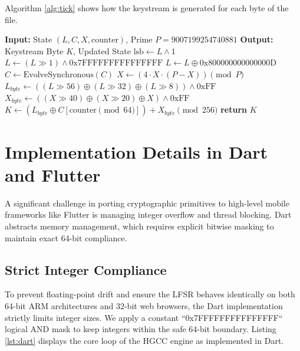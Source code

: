 \documentclass[runningheads]{llncs}
\begin{document}
Algorithm \ref{alg:tick} shows how the keystream is generated for each byte of the file.

\begin{algorithm}
\caption{Hardened HGCC Generation Tick}\label{alg:tick}
\begin{algorithmic}[1]
\Statex \textbf{Input:} State $(L, C, X, \text{counter})$, Prime $P = 9007199254740881$
\Statex \textbf{Output:} Keystream Byte $K$, Updated State
\State $\text{lsb} \gets L \land 1$
\State $L \gets (L \gg 1) \land \text{0x7FFFFFFFFFFFFFFF}$
    \State $L \gets L \oplus \text{0x800000000000000D}$
\EndIf
{}
    \State $C \gets \text{EvolveSynchronous}(C)$
\EndIf
\State $X \gets (4 \cdot X \cdot (P - X)) \pmod P$
\State $L_{byte} \gets ((L \gg 56) \oplus (L \gg 32) \oplus (L \gg 8)) \land \text{0xFF}$
\State $X_{byte} \gets ((X \gg 40) \oplus (X \gg 20) \oplus X) \land \text{0xFF}$
\State $K \gets (L_{byte} \oplus C[\text{counter} \pmod{64}]) + X_{byte} \pmod{256}$
\State \textbf{return} $K$
\end{algorithmic}
\end{algorithm}

\section{Implementation Details in Dart and Flutter}
A significant challenge in porting cryptographic primitives to high-level mobile frameworks like Flutter is managing integer overflow and thread blocking. Dart abstracts memory management, which requires explicit bitwise masking to maintain exact 64-bit compliance.

\subsection{Strict Integer Compliance}
To prevent floating-point drift and ensure the LFSR behaves identically on both 64-bit ARM architectures and 32-bit web browsers, the Dart implementation strictly limits integer sizes. We apply a constant ``0x7FFFFFFFFFFFFFFF`` logical AND mask to keep integers within the safe 64-bit boundary. Listing \ref{lst:dart} displays the core loop of the HGCC engine as implemented in Dart.
\end{document}
